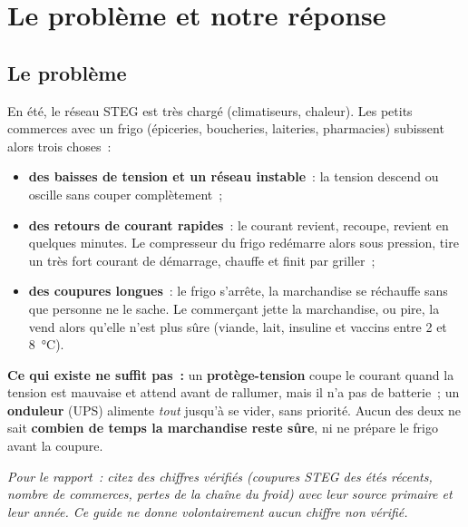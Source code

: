 \section{Le problème et notre réponse}\label{sec:probleme}

\subsection{Le problème}
En été, le réseau STEG est très chargé (climatiseurs, chaleur). Les petits commerces avec un frigo (épiceries, boucheries, laiteries, pharmacies) subissent alors trois choses~:
\begin{itemize}
  \item \textbf{des baisses de tension et un réseau instable}~: la tension descend ou oscille sans couper complètement~;
  \item \textbf{des retours de courant rapides}~: le courant revient, recoupe, revient en quelques minutes. Le compresseur du frigo redémarre alors sous pression, tire un très fort courant de démarrage, chauffe et finit par griller~;
  \item \textbf{des coupures longues}~: le frigo s'arrête, la marchandise se réchauffe sans que personne ne le sache. Le commerçant jette la marchandise, ou pire, la vend alors qu'elle n'est plus sûre (viande, lait, insuline et vaccins entre 2 et 8~°C).
\end{itemize}
\textbf{Ce qui existe ne suffit pas~:} un \textbf{protège-tension} coupe le courant quand la tension est mauvaise et attend avant de rallumer, mais il n'a pas de batterie~; un \textbf{onduleur} (UPS) alimente \emph{tout} jusqu'à se vider, sans priorité. Aucun des deux ne sait \textbf{combien de temps la marchandise reste sûre}, ni ne prépare le frigo avant la coupure.

{\small\textit{Pour le rapport~: citez des chiffres vérifiés (coupures STEG des étés récents, nombre de commerces, pertes de la chaîne du froid) avec leur source primaire et leur année. Ce guide ne donne volontairement aucun chiffre non vérifié.}}

